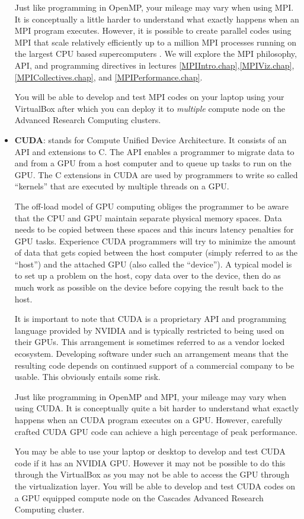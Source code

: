 \begin{itemize}
    Just like programming in OpenMP, your mileage may vary when using MPI. It is conceptually a little harder to understand what exactly happens when an MPI program executes. However, it is possible to create parallel codes using MPI that scale relatively efficiently up to a million MPI processes running on the largest CPU based supercomputers \cite{balaji2009mpi}.  We will explore the MPI philosophy, API, and programming directives in lectures \ref{MPIIntro.chap},\ref{MPIViz.chap}, \ref{MPICollectives.chap},  and \ref{MPIPerformance.chap}. 
    
    You will be able to develop and test MPI codes on your laptop using your VirtualBox after which you can deploy it to \emph{multiple} compute node on the Advanced Research Computing clusters.
    
    \item {\bf CUDA}: stands for Compute Unified Device Architecture.  It consists of an API and extensions to C. The API enables a programmer to migrate data to and from a GPU from a host computer and to queue up tasks to run on the GPU. The C extensions in CUDA are used by programmers to write so called ``kernels'' that are executed by multiple threads on a GPU. 
    
    The off-load model of GPU computing obliges the programmer to be aware that the CPU and GPU maintain separate physical memory spaces. Data needs to be copied between these spaces and this incurs latency penalties for GPU tasks. Experience CUDA programmers will try to minimize the amount of data that gets copied between the host computer (simply referred to as the ``host'') and the attached GPU (also called the ``device''). A typical model is to set up a problem on the host, copy data over to the device, then do as much work as possible on the device before copying the result back to the host. 
    
    It is important to note that CUDA is a proprietary API and programming language provided by NVIDIA and is typically restricted to being used on their GPUs. This arrangement is sometimes referred to as a vendor locked ecosystem. Developing software under such an arrangement means that the resulting code depends on continued support of a commercial company to be usable. This obviously entails some risk.
    
     Just like programming in OpenMP and MPI, your mileage may vary when using CUDA. It is conceptually quite a bit harder to understand what exactly happens when an CUDA program executes on a GPU. However, carefully crafted CUDA GPU code can achieve a high percentage of peak performance.
     
     You may be able to use your laptop or desktop to develop and test CUDA code if it has an NVIDIA GPU. However it may not be possible to do this through the VirtualBox as you may not be able to access the GPU through the virtualization layer.  You will be able to develop and test CUDA codes on a GPU equipped compute node on the Cascades Advanced Research Computing cluster.
     
\end{itemize}

